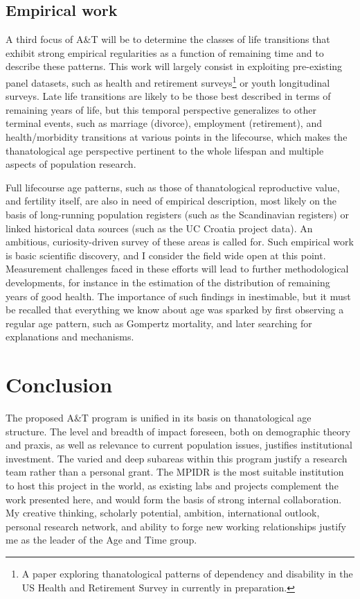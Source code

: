 \documentclass[a4paper,12pt]{article}
\begin{document}
\subsection{Empirical work}
A third focus of A\&T will be to determine the classes of
life transitions that exhibit strong empirical regularities as a function
of remaining time and to describe these patterns. This work will largely consist
in exploiting pre-existing panel datasets, such as health and retirement
surveys\footnote{A paper exploring thanatological patterns of dependency and
disability in the US Health and Retirement Survey in currently in preparation.}
or youth longitudinal surveys.
Late life transitions are likely to be those best described in terms of
remaining years of life, but this temporal perspective generalizes to other
terminal events, such as marriage (divorce), employment (retirement), and health/morbidity transitions at various points in
the lifecourse, which makes the thanatological age perspective pertinent to
the whole lifespan and multiple aspects of population research. 

Full lifecourse age patterns, such as those of
thanatological reproductive value, and fertility itself, are also in need of empirical description, most likely on the basis of long-running population registers (such as the Scandinavian registers) or linked historical
data sources (such as the UC Croatia project data).
An ambitious, curiosity-driven survey of these areas is called for.
Such empirical work is basic scientific discovery, and I consider the field wide
open at this point. Measurement challenges faced in these efforts will lead
to further methodological developments, for instance in the estimation of the
distribution of remaining years of good health. The importance of
such findings in inestimable, but it must be recalled that everything we know
about age was sparked by first observing a regular age pattern, such as Gompertz
mortality, and later searching for explanations and mechanisms.

\section{Conclusion}
The proposed A\&T program is unified in its basis on thanatological age
structure. The level and breadth of impact foreseen, both on demographic
theory and praxis, as well as relevance to current population issues, justifies
institutional investment. The varied and deep subareas within this program
justify a research team rather than a personal grant. The MPIDR is the most suitable
institution to host this project in the world, as existing labs and projects
complement the work presented here, and would form the basis of strong internal collaboration.
My creative thinking, scholarly potential, ambition, international outlook,
personal research network, and ability to forge new working relationships
justify me as the leader of the Age and Time group.
\end{document}
